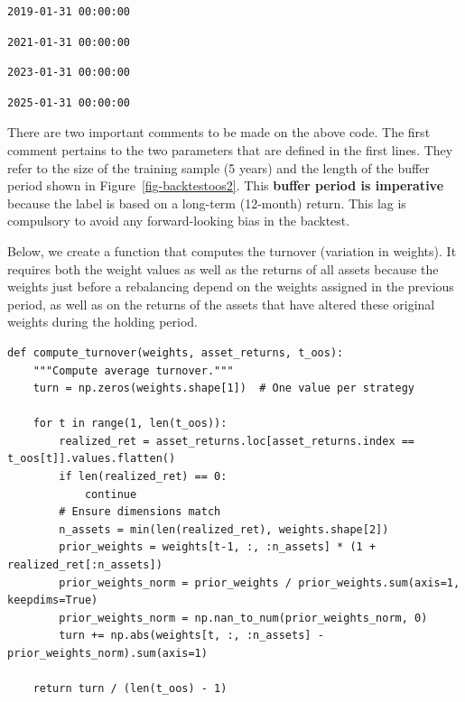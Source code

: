 \begin{verbatim}
2019-01-31 00:00:00
\end{verbatim}

\begin{verbatim}
2021-01-31 00:00:00
\end{verbatim}

\begin{verbatim}
2023-01-31 00:00:00
\end{verbatim}

\begin{verbatim}
2025-01-31 00:00:00
\end{verbatim}

There are two important comments to be made on the above code. The first comment pertains to the two parameters that are defined in the first lines. They refer to the size of the training sample (5 years) and the length of the buffer period shown in Figure~\ref{fig-backtestoos2}. This \textbf{buffer period is imperative} because the label is based on a long-term (12-month) return. This lag is compulsory to avoid any forward-looking bias in the backtest.

Below, we create a function that computes the turnover (variation in weights). It requires both the weight values as well as the returns of all assets because the weights just before a rebalancing depend on the weights assigned in the previous period, as well as on the returns of the assets that have altered these original weights during the holding period.

\begin{verbatim}
def compute_turnover(weights, asset_returns, t_oos):
    """Compute average turnover."""
    turn = np.zeros(weights.shape[1])  # One value per strategy
    
    for t in range(1, len(t_oos)):
        realized_ret = asset_returns.loc[asset_returns.index == t_oos[t]].values.flatten()
        if len(realized_ret) == 0:
            continue
        # Ensure dimensions match
        n_assets = min(len(realized_ret), weights.shape[2])
        prior_weights = weights[t-1, :, :n_assets] * (1 + realized_ret[:n_assets])
        prior_weights_norm = prior_weights / prior_weights.sum(axis=1, keepdims=True)
        prior_weights_norm = np.nan_to_num(prior_weights_norm, 0)
        turn += np.abs(weights[t, :, :n_assets] - prior_weights_norm).sum(axis=1)
    
    return turn / (len(t_oos) - 1)
\end{verbatim}

